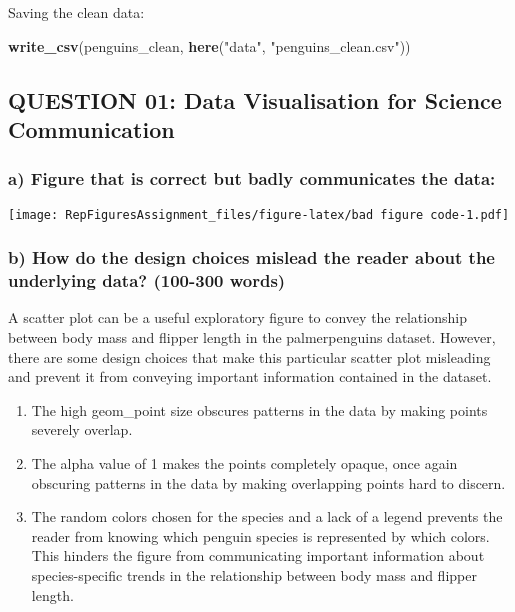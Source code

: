 \documentclass[
]{article}
\newenvironment{Shaded}{\begin{snugshade}}{\end{snugshade}}
\newcommand{\FunctionTok}[1]{\textcolor[rgb]{0.13,0.29,0.53}{\textbf{#1}}}
\newcommand{\NormalTok}[1]{#1}
\newcommand{\StringTok}[1]{\textcolor[rgb]{0.31,0.60,0.02}{#1}}
\begin{document}
Saving the clean data:

\begin{Shaded}
\begin{Highlighting}[]
\FunctionTok{write\_csv}\NormalTok{(penguins\_clean, }\FunctionTok{here}\NormalTok{(}\StringTok{"data"}\NormalTok{, }\StringTok{"penguins\_clean.csv"}\NormalTok{))}
\end{Highlighting}
\end{Shaded}

\subsection{QUESTION 01: Data Visualisation for Science
Communication}\label{question-01-data-visualisation-for-science-communication}

\subsubsection{a) Figure that is correct but badly communicates the
data:}\label{a-figure-that-is-correct-but-badly-communicates-the-data}

\texttt{[image: RepFiguresAssignment\_files/figure-latex/bad figure code-1.pdf]}

\subsubsection{b) How do the design choices mislead the reader about the
underlying data? (100-300
words)}\label{b-how-do-the-design-choices-mislead-the-reader-about-the-underlying-data-100-300-words}

A scatter plot can be a useful exploratory figure to convey the
relationship between body mass and flipper length in the palmerpenguins
dataset. However, there are some design choices that make this
particular scatter plot misleading and prevent it from conveying
important information contained in the dataset.

\begin{enumerate}
\def\labelenumi{\arabic{enumi}.}
\item
  The high geom\_point size obscures patterns in the data by making
  points severely overlap.
\item
  The alpha value of 1 makes the points completely opaque, once again
  obscuring patterns in the data by making overlapping points hard to
  discern.
\item
  The random colors chosen for the species and a lack of a legend
  prevents the reader from knowing which penguin species is represented
  by which colors. This hinders the figure from communicating important
  information about species-specific trends in the relationship between
  body mass and flipper length.
\end{enumerate}
\end{document}
